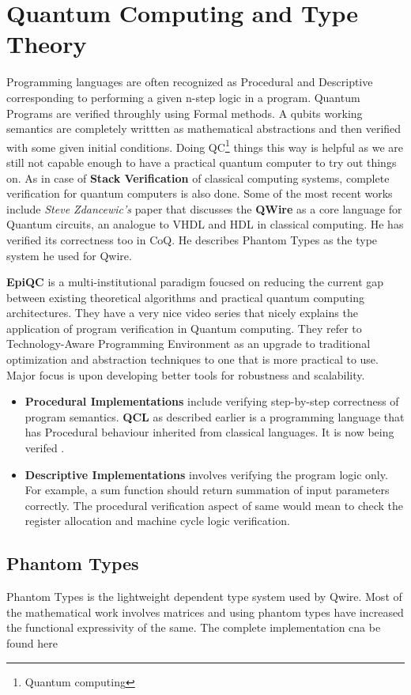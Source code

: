 \chapter{Quantum Computing and Type Theory }
Programming languages are often recognized as Procedural and Descriptive corresponding to performing a given n-step logic in a program. Quantum Programs are verified throughly using Formal methods. A qubits working semantics are completely writtten as mathematical abstractions and then verified with some given initial conditions. Doing QC\footnote{Quantum computing} things this way is helpful as we are still not capable enough to have a practical quantum computer to try out things on. As in case of \textbf{Stack Verification} of classical computing systems, complete verification for quantum computers is also done. Some of the most recent works include \textit{Steve Zdancewic's} paper that discusses the \textbf{QWire} as a core language for Quantum circuits, an analogue to VHDL and HDL in classical computing. He has verified its correctness too in CoQ. He describes Phantom Types as the type system he used for Qwire.

\textbf{EpiQC} is a multi-institutional paradigm foucsed on reducing the current gap between existing theoretical algorithms and practical quantum computing architectures. They have a very nice video series that nicely explains the application of program verification in Quantum computing. They refer to Technology-Aware Programming Environment as an upgrade to traditional optimization and abstraction techniques to one that is more practical to use. Major focus is upon developing better tools for robustness and scalability.


\begin{itemize}
\item{
	\textbf{Procedural Implementations} include verifying step-by-step correctness of program semantics. \textbf{QCL} as described earlier is a programming language that has Procedural behaviour inherited from classical languages. It is now being verifed .   
}
\item{
	\textbf{Descriptive Implementations} involves verifying the program logic only. For example, a sum function should return summation of input parameters correctly. The procedural verification aspect of same would mean to check the register allocation and machine cycle logic verification. 
}
\end{itemize}

\section{Phantom Types}
Phantom Types is the  lightweight dependent type system used by Qwire. Most of the mathematical work involves matrices and using phantom types have increased the functional expressivity of the same. The complete implementation cna be found here 
